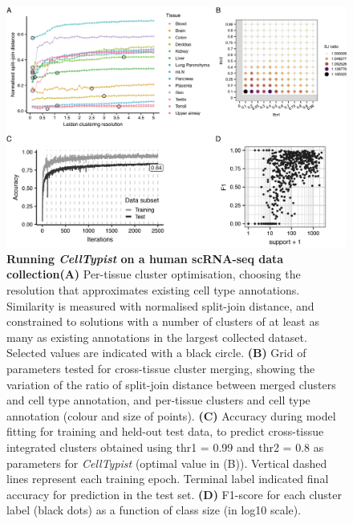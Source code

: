 \begin{figure}[ht!]
    \centering    
    \includegraphics[width=1.0\textwidth]{Chapter4/Figs/chap4_figHA.png} %
    \caption[Running \textit{CellTypist} on a human scRNA-seq data collection]{\textbf{Running \textit{CellTypist} on a human scRNA-seq data collection}\newline\textbf{(A)} Per-tissue cluster optimisation, choosing the resolution that approximates existing cell type annotations. Similarity is measured with normalised split-join distance, and constrained to solutions with a number of clusters of at least as many as existing annotations in the largest collected dataset. Selected values are indicated with a black circle. \textbf{(B)} Grid of parameters tested for cross-tissue cluster merging, showing the variation of the ratio of split-join distance between merged clusters and cell type annotation, and per-tissue clusters and cell type annotation (colour and size of points). \textbf{(C)} Accuracy during model fitting for training and held-out test data, to predict cross-tissue integrated clusters obtained using thr1 = 0.99 and thr2 = 0.8 as parameters for \textit{CellTypist} (optimal value in (B)). Vertical dashed lines represent each training epoch. Terminal label indicated final accuracy for prediction in the test set. \textbf{(D)} F1-score for each cluster label (black dots) as a function of class size (in log10 scale).}
    \label{fig:chap4_HA}
\end{figure}


